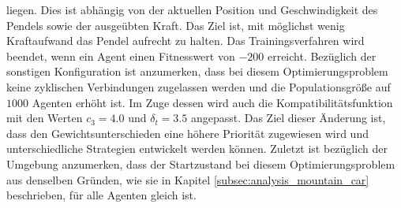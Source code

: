 liegen. Dies ist abhängig von der aktuellen Position und Geschwindigkeit des Pendels sowie der ausgeübten Kraft. Das Ziel ist, mit möglichst wenig Kraftaufwand das Pendel aufrecht zu halten. Das Trainingsverfahren wird beendet, wenn ein Agent einen Fitnesswert von $-200$ erreicht. Bezüglich der sonstigen Konfiguration ist anzumerken, dass bei diesem Optimierungsproblem keine zyklischen Verbindungen zugelassen werden und die Populationsgröße auf $1000$ Agenten erhöht ist. Im Zuge dessen wird auch die Kompatibilitätsfunktion mit den Werten $c_3=4.0$ und $\delta_t=3.5$ angepasst. Das Ziel dieser Änderung ist, dass den Gewichtsunterschieden eine höhere Priorität zugewiesen wird und unterschiedliche Strategien entwickelt werden können. Zuletzt ist bezüglich der Umgebung anzumerken, dass der Startzustand bei diesem Optimierungsproblem aus denselben Gründen, wie sie in Kapitel \ref{subsec:analysis_mountain_car} beschrieben, für alle Agenten gleich ist.  
